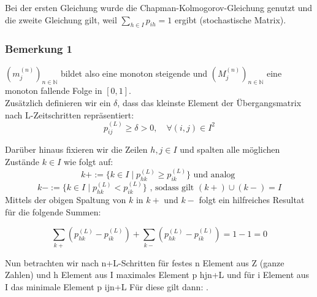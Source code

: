 \documentclass[a4paper]{article}
\begin{document}
Bei der ersten Gleichung wurde die Chapman-Kolmogorov-Gleichung genutzt und die zweite
Gleichung gilt, weil
$\sum_{h\in I} p_{ih} = 1$
ergibt (stochastische Matrix).

\subsubsection{Bemerkung 1}
$(m_j ^{(n)})_{n\in \mathbb{N}}$ bildet also eine monoton steigende und 
$(M_j ^{(n)})_{n \in \mathbb{N}}$
eine monoton fallende Folge in
$[0,1]$.
\\

Zusätzlich definieren wir ein $\delta$, dass das kleinste Element der Übergangsmatrix nach L-Zeitschritten
repräsentiert:
\[
p_{ij} ^{(L)} \geq \delta > 0, \quad
\forall (i, j) \in I^2
\] 

Darüber hinaus fixieren wir die Zeilen $h, j \in I$ und spalten alle
möglichen Zustände $k \in I$ wie folgt auf:
\[
k+ := \{
	k\in I \; \vert \; p_{hk} ^{(L)} \geq p_{ik} ^{(L)}
\} 
	\text{ und analog }
\] 
\[
k- := \{
	k\in I \; \vert \; p_{hk} ^{(L)} < p_{ik} ^{(L)}
\} \text{ , sodass gilt } (k+) \cup (k-) = I
\] 
Mittels der obigen Spaltung von $k$ in $k+$ und $k-$ folgt ein hilfreiches Resultat für die folgende Summen:

\[
\sum_{k+} \left(
	p_{hk} ^{(L)} - p_{ik} ^{(L)}
\right) + \sum_{k-} \left(
	p_{hk} ^{(L)} - p_{ik} ^{(L)}
\right) = 1 - 1 = 0
\] 

Nun betrachten wir nach n+L-Schritten für festes n Element aus Z (ganze Zahlen) und h Element
aus I maximales Element p hjn+L und für i Element aus I das minimale Element p ijn+L
Für diese gilt dann:
.
\end{document}
